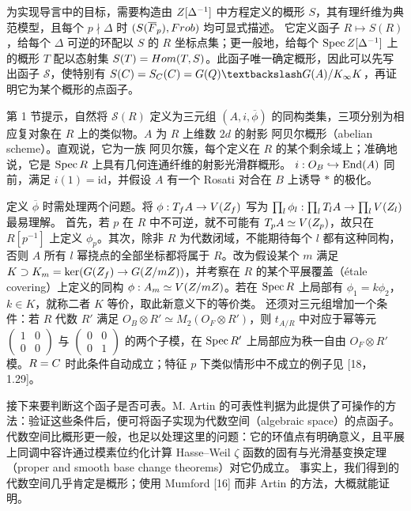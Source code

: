 为实现导言中的目标，需要构造由 $Z[\Delta^{-1}]$ 中方程定义的概形 $S$，其有理纤维为典范模型，且每个
$p\nmid\Delta$ 时 $(S(\overline{F}_p),Frob)$ 均可显式描述。
它定义函子 $R\mapsto S(R)$，给每个 $\Delta$ 可逆的环配以 $S$ 的
$R$ 坐标点集；更一般地，给每个 $\Spec\Z[\Delta^{-1}]$ 上的概形
$T$ 配以态射集 $S(T)=Hom(T,S)$。此函子唯一确定概形，因此可以先写出函子
$\mathcal S$，使特别有 $\mathcal S(\C)=S_\C(\C)=G(\Q)\backslash G(\A)/K_\infty K$，再证明它为某个概形的点函子。

第 1 节提示，自然将 $\mathcal S(R)$ 定义为三元组 $(A,i,\overline\phi)$ 的同构类集，三项分别为相应复对象在
$R$ 上的类似物。$A$ 为 $R$ 上维数 $2d$ 的射影 阿贝尔概形（abelian scheme）。直观说，它为一族
阿贝尔簇，每个定义在 $R$ 的某个剩余域上；准确地说，它是 $\Spec R$ 上具有几何连通纤维的射影光滑群概形。
$i:O_B\hookrightarrow\End(A)$ 同前，满足 $i(1)=\mathrm{id}$，并假设
$A$ 有一个 Rosati 对合在 $B$ 上诱导 $*$ 的极化。

定义 $\overline\phi$ 时需处理两个问题。将 $\phi:T_fA\to V(Z_f)$ 写为
$\prod_l\phi_l:\prod_lT_lA\to\prod_lV(Z_l)$ 最易理解。
首先，若 $p$ 在 $R$ 中不可逆，就不可能有 $T_pA\simeq V(Z_p)$，故只在
$R[p^{-1}]$ 上定义 $\phi_p$。其次，除非 $R$ 为代数闭域，不能期待每个 $l$ 都有这种同构，否则
$A$ 所有 $l$ 幂挠点的全部坐标都将属于 $R$。改为假设某个 $m$ 满足
$K\supset K_m=\ker(G(Z_f)\to G(Z/mZ))$，并考察在 $R$ 的某个平展覆盖（étale covering）上定义的同构
$\phi:A_m\simeq V(Z/mZ)$。若在 $\Spec R$ 上局部有
$\phi_1=k\phi_2$，$k\in K$，就称二者 $K$ 等价，取此新意义下的等价类。
还须对三元组增加一个条件：若 $R$ 代数 $R'$ 满足
$O_B\otimes R'\simeq M_2(O_F\otimes R')$，则 $t_{A/R}$ 中对应于幂等元
$\begin{pmatrix}1&0\\0&0\end{pmatrix}$ 与 $\begin{pmatrix}0&0\\0&1\end{pmatrix}$ 的两个子模，在
$\Spec R'$ 上局部应为秩一自由 $O_F\otimes R'$ 模。$R=C$ 时此条件自动成立；特征
$p$ 下类似情形中不成立的例子见 [18，1.29]。

接下来要判断这个函子是否可表。M. Artin 的可表性判据为此提供了可操作的方法：验证这些条件后，便可将函子实现为代数空间（algebraic space）的点函子。
代数空间比概形更一般，也足以处理这里的问题：它的环值点有明确意义，且平展上同调中容许通过模素位约化计算
Hasse--Weil $\zeta$ 函数的固有与光滑基变换定理（proper and smooth base change theorems）对它仍成立。
事实上，我们得到的代数空间几乎肯定是概形；使用 Mumford [16] 而非 Artin 的方法，大概就能证明。

